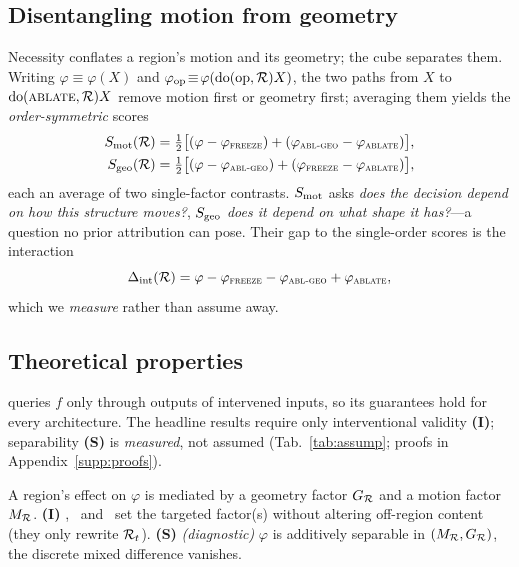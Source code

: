 \subsection{Disentangling motion from geometry}
\label{sec:method-decomp}
Necessity conflates a region's motion and its geometry; the cube separates them. Writing $\varphi\!\equiv\!\varphi(X)$ and $\varphi_{\mathrm{op}}\!\equiv\!\varphi(\mathrm{do}(\mathrm{op},\mathcal{R})X)$, the two paths from $X$ to $\mathrm{do}(\textsc{ablate},\mathcal{R})X$ remove motion first or geometry first; averaging them yields the \emph{order-symmetric} scores
\begin{align}
S_{\mathrm{mot}}(\mathcal{R})&=\tfrac12\big[(\varphi-\varphi_{\textsc{freeze}})+(\varphi_{\textsc{abl-geo}}-\varphi_{\textsc{ablate}})\big],\nonumber\\
S_{\mathrm{geo}}(\mathcal{R})&=\tfrac12\big[(\varphi-\varphi_{\textsc{abl-geo}})+(\varphi_{\textsc{freeze}}-\varphi_{\textsc{ablate}})\big],
\label{eq:sym}
\end{align}
each an average of two single-factor contrasts. $S_{\mathrm{mot}}$ asks \emph{does the decision depend on how this structure moves?}, $S_{\mathrm{geo}}$ \emph{does it depend on what shape it has?}---a question no prior attribution can pose. Their gap to the single-order scores is the interaction
\begin{equation}
\Delta_{\mathrm{int}}(\mathcal{R})=\varphi-\varphi_{\textsc{freeze}}-\varphi_{\textsc{abl-geo}}+\varphi_{\textsc{ablate}},
\label{eq:dint}
\end{equation}
which we \emph{measure} rather than assume away.

\subsection{Theoretical properties}
\label{sec:method-theory}
\method queries $f$ only through outputs of intervened inputs, so its guarantees hold for every architecture. The headline results require only interventional validity \textbf{(I)}; separability \textbf{(S)} is \emph{measured}, not assumed (Tab.~\ref{tab:assump}; proofs in Appendix~\ref{supp:proofs}).

\begin{assumption}
\label{asm:factor}
A region's effect on $\varphi$ is mediated by a geometry factor $G_{\mathcal{R}}$ and a motion factor $M_{\mathcal{R}}$. \textbf{(I)} \frz, \ablgeo\ and \abl\ set the targeted factor(s) without altering off-region content (they only rewrite $\mathcal{R}_t$). \textbf{(S)} \emph{(diagnostic)} $\varphi$ is additively separable in $(M_{\mathcal{R}},G_{\mathcal{R}})$, \ie the discrete mixed difference vanishes.
\end{assumption}

